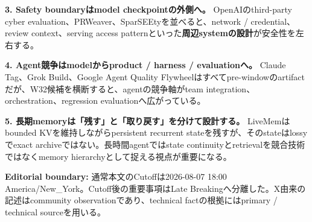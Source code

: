 \begin{tcolorbox}[enhanced,colback=SurveySoft,colframe=SurveyRule,boxrule=0.4pt,arc=1mm,left=3mm,right=3mm,top=2mm,bottom=2mm]
\textbf{3. Safety boundaryはmodel checkpointの外側へ。}\quad
OpenAIのthird-party cyber evaluation、PRWeaver、SparSEEtyを並べると、network / credential、review context、serving access patternといった\textbf{周辺systemの設計}が安全性を左右する\cite{openai-third-party-cyber-evals,prweaver-paper,sparseety-paper}。
\end{tcolorbox}

\begin{tcolorbox}[enhanced,colback=SurveySoft,colframe=SurveyRule,boxrule=0.4pt,arc=1mm,left=3mm,right=3mm,top=2mm,bottom=2mm]
\textbf{4. Agent競争はmodelからproduct / harness / evaluationへ。}\quad
Claude Tag、Grok Build、Google Agent Quality Flywheelはすべてpre-windowのartifactだが、W32候補を横断すると、agentの競争軸がteam integration、orchestration、regression evaluationへ広がっている\cite{claude-tag-announcement,grok-build-open-source,google-agent-quality-flywheel}。
\end{tcolorbox}

\begin{tcolorbox}[enhanced,colback=SurveySoft,colframe=SurveyRule,boxrule=0.4pt,arc=1mm,left=3mm,right=3mm,top=2mm,bottom=2mm]
\textbf{5. 長期memoryは「残す」と「取り戻す」を分けて設計する。}\quad
LiveMemはbounded KVを維持しながらpersistent recurrent stateを残すが、そのstateはlossyでexact archiveではない\cite{livemem-paper}。長時間agentではstate continuityとretrievalを競合技術ではなくmemory hierarchyとして捉える視点が重要になる。
\end{tcolorbox}

\vspace{2mm}
\footnotesize
\textbf{Editorial boundary:} 通常本文のCutoffは2026-08-07 18:00 America/New\_York。Cutoff後の重要事項はLate Breakingへ分離した。X由来の記述はcommunity observationであり、technical factの根拠にはprimary / technical sourceを用いる。
\normalsize
